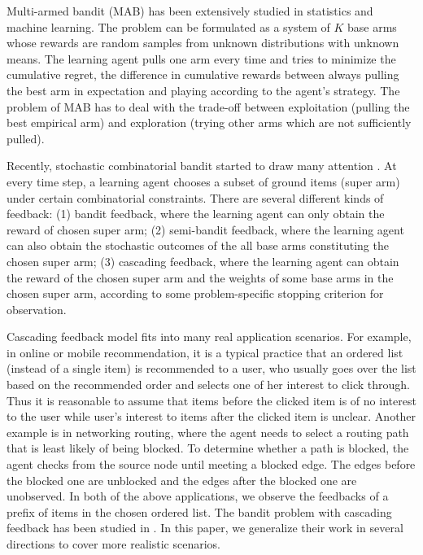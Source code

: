 \documentclass{article}
\begin{document}
Multi-armed bandit (MAB) has been extensively studied in statistics and machine learning. 
The problem can be formulated as a system of $K$ base arms whose rewards are random samples from unknown distributions with unknown means.
 The learning agent pulls one arm every time and tries to minimize the cumulative regret, 
 the difference in cumulative rewards between always pulling the best arm in expectation and
 playing according to the agent's strategy.
The problem of MAB has to deal with the trade-off between exploitation (pulling the best empirical arm) and exploration (trying other arms which are not sufficiently pulled).

Recently, stochastic combinatorial bandit started to draw many attention \cite{gai2012combinatorial,chen2013combinatorial,lin2014combinatorial,GMM14,chen2014pure,KWAEE14,kveton2014tight,kveton2015cascading,kveton2015combinatorial,lin2015online,Combes2015}. 
At every time step, a learning agent chooses a subset of ground items (super arm) under certain combinatorial constraints. There are several different kinds of feedback: (1) bandit feedback, where the learning agent can only obtain the reward of chosen super arm; (2) semi-bandit feedback, where the learning agent can also obtain the stochastic outcomes of the all base arms constituting the chosen super arm; 
(3) cascading feedback, where the learning agent can obtain the reward of the chosen super arm and the weights of some base arms in the chosen super arm, according to some problem-specific stopping criterion for observation.

Cascading feedback model fits into many real application scenarios.
For example, in online or mobile recommendation, it is a typical practice that an ordered list
	(instead of a single item) is recommended to a user, who
	usually goes over the list based on the recommended order and selects one of her interest to
	click through.
Thus it is reasonable to assume that items before the clicked item is of no interest to the user
	while user's interest to items after the clicked item is unclear.
Another example is in networking routing, where the agent needs to select a routing path that is least
	likely of being blocked.
To determine whether a path is blocked, the agent checks from the source node until meeting a blocked edge. 
The edges before the blocked one are unblocked and the edges after the blocked one are unobserved.
In both of the above applications, we observe the feedbacks of a prefix of items in the chosen ordered list. The bandit problem with cascading feedback has been studied in \cite{kveton2015cascading,kveton2015combinatorial}. 
In this paper, we generalize their work in several directions to cover more realistic scenarios.
\end{document}
